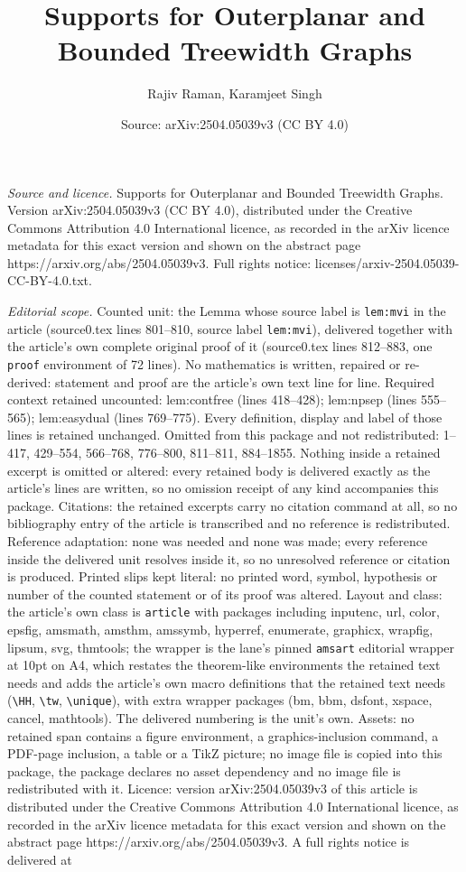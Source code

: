 \documentclass[10pt,a4paper]{amsart}
\title[Supports for Outerplanar and Bounded Treewidth Graphs]{Supports for Outerplanar and Bounded Treewidth Graphs}
\author{Rajiv Raman, Karamjeet Singh}
\date{Source: arXiv:2504.05039v3 (CC BY 4.0)}
\begin{document}
\maketitle

\noindent\emph{Source and licence.} Supports for Outerplanar and Bounded Treewidth Graphs. Version arXiv:2504.05039v3 (CC BY 4.0), distributed under the Creative Commons Attribution 4.0 International licence, as recorded in the arXiv licence metadata for this exact version and shown on the abstract page https://arxiv.org/abs/2504.05039v3. Full rights notice: licenses/arxiv-2504.05039-CC-BY-4.0.txt.\par\smallskip

\noindent\textit{Editorial scope.} Counted unit: the Lemma whose source label is \texttt{lem:mvi} in the article (source0.tex lines 801--810, source label \texttt{lem:mvi}), delivered together with the article's own complete original proof of it (source0.tex lines 812--883, one \texttt{proof} environment of 72 lines). No mathematics is written, repaired or re-derived: statement and proof are the article's own text line for line. Required context retained uncounted: lem:contfree (lines 418--428); lem:npsep (lines 555--565); lem:easydual (lines 769--775). Every definition, display and label of those lines is retained unchanged. Omitted from this package and not redistributed: 1--417, 429--554, 566--768, 776--800, 811--811, 884--1855. Nothing inside a retained excerpt is omitted or altered: every retained body is delivered exactly as the article's lines are written, so no omission receipt of any kind accompanies this package. Citations: the retained excerpts carry no citation command at all, so no bibliography entry of the article is transcribed and no reference is redistributed. Reference adaptation: none was needed and none was made; every reference inside the delivered unit resolves inside it, so no unresolved reference or citation is produced. Printed slips kept literal: no printed word, symbol, hypothesis or number of the counted statement or of its proof was altered. Layout and class: the article's own class is \texttt{article} with packages including inputenc, url, color, epsfig, amsmath, amsthm, amssymb, hyperref, enumerate, graphicx, wrapfig, lipsum, svg, thmtools; the wrapper is the lane's pinned \texttt{amsart} editorial wrapper at 10pt on A4, which restates the theorem-like environments the retained text needs and adds the article's own macro definitions that the retained text needs (\texttt{\textbackslash HH}, \texttt{\textbackslash tw}, \texttt{\textbackslash unique}), with extra wrapper packages (bm, bbm, dsfont, xspace, cancel, mathtools). The delivered numbering is the unit's own. Assets: no retained span contains a figure environment, a graphics-inclusion command, a PDF-page inclusion, a table or a TikZ picture; no image file is copied into this package, the package declares no asset dependency and no image file is redistributed with it. Licence: version arXiv:2504.05039v3 of this article is distributed under the Creative Commons Attribution 4.0 International licence, as recorded in the arXiv licence metadata for this exact version and shown on the abstract page https://arxiv.org/abs/2504.05039v3. A full rights notice is delivered at 
\end{document}
